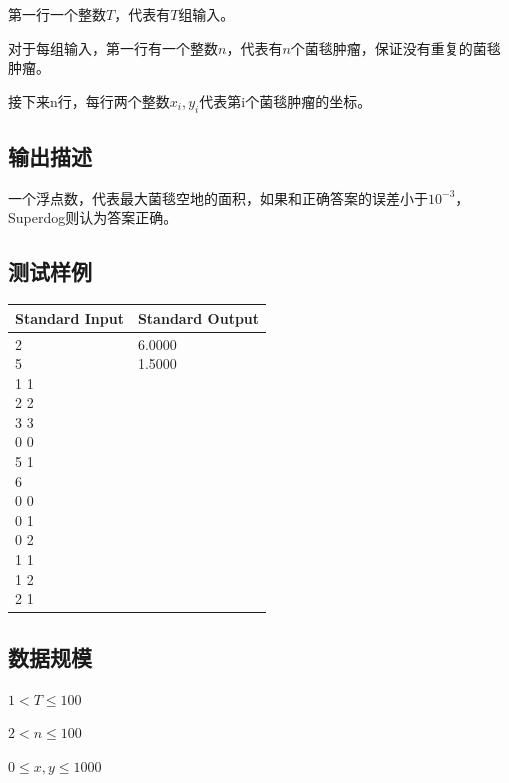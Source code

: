 第一行一个整数$T$，代表有$T$组输入。

对于每组输入，第一行有一个整数$n$，代表有$n$个菌毯肿瘤，保证没有重复的菌毯肿瘤。

接下来n行，每行两个整数$x_i,y_i$代表第i个菌毯肿瘤的坐标。

\subsection*{输出描述}

一个浮点数，代表最大菌毯空地的面积，如果和正确答案的误差小于$10^{-3}$，Superdog则认为答案正确。

\subsection*{测试样例}

\begin{table}[H]
\begin{tabularx}{\textwidth}{|X|X|}
    \hline
    \textbf{Standard Input} & \textbf{Standard Output} \\ 
    \hline 
    \tablecell{
        2 \\
        5 \\
        1 1 \\
        2 2 \\
        3 3 \\
        0 0 \\
        5 1 \\
        6 \\
        0 0 \\
        0 1 \\
        0 2 \\
        1 1 \\
        1 2 \\
        2 1 \\
    } & 
    \tablecell{
        6.0000 \\
        1.5000 \\
        \\ \\ \\ \\ \\ \\ \\ \\ \\ \\ \\ \\
    } \\
    \hline
\end{tabularx}
\end{table}
\subsection*{数据规模}
$1< T \leq 100$

$2<n \leq 100$

$0 \leq x,y \leq 1000$